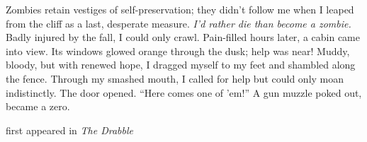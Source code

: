 
Zombies retain vestiges of self-preservation; they didn't follow me when
I leaped from the cliff as a last, desperate measure. \emph{I'd rather
die than become a zombie.} Badly injured by the fall, I could only
crawl. Pain-filled hours later, a cabin came into view. Its windows
glowed orange through the dusk; help was near! Muddy, bloody, but with
renewed hope, I dragged myself to my feet and shambled along the fence.
Through my smashed mouth, I called for help but could only moan
indistinctly. The door opened. ``Here comes one of 'em!'' A gun muzzle
poked out, became a zero.

first appeared in \emph{The Drabble}

